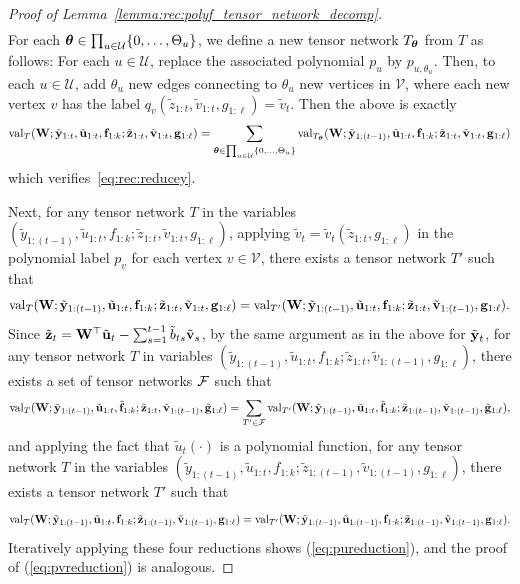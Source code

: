 \documentclass[10pt,reqno]{amsart}
\def\cU{\mathcal{U}}
\def\cV{\mathcal{V}}
\def\val{\operatorname{val}}
\def\bW{{\mathbf{W}}}
\def\bu{{\mathbf{u}}}
\def\bz{{\mathbf{z}}}
\def\bff{{\mathbf{f}}}
\begin{document}
\begin{proof}[Proof of Lemma~\ref{lemma:rec:polyf_tensor_network_decomp}]
\begin{align*}
\end{align*}
For each $\btheta \in \prod_{u\in\cU}\{0,\ldots,\Theta_u\}$,
we define a new tensor network $T_{\bm{\theta}}$ from $T$ as follows: For
each $u\in\cU$, replace the associated polynomial $p_u$ by $p_{u,\theta_u}$. 
Then, to each $u \in \cU$, add $\theta_u$ new edges connecting to $\theta_u$ new 
vertices in $\cV$, where each new vertex $v$ has the label
$q_v(\tilde z_{1:t}, \tilde v_{1:t}, g_{1:\ell}) = \tilde v_t$. 
Then the above is exactly
\begin{align*}
\val_T(\bW;\tilde\by_{1:t},\tilde\bu_{1:{t}},\bff_{1:k};
\tilde\bz_{1:t},\tilde\bv_{1:t},\bg_{1:\ell})
 = \sum_{\btheta\in\prod_{u\in\cU}\{0,\ldots,\Theta_u\}}
\val_{T_{\btheta}}(\bW; \tilde\by_{1:(t-1)}, \tilde\bu_{1:t}, \bff_{1:k};
\tilde\bz_{1:t},\tilde\bv_{1:t},\bg_{1:\ell})
\end{align*}
which verifies~\eqref{eq:rec:reducey}.

Next, for any tensor network $T$ in the variables $(\tilde
y_{1:(t-1)},\tilde u_{1:t},f_{1:k};\tilde z_{1:t},\tilde v_{1:t},g_{1:\ell})$,
applying $\tilde v_t=\tilde v_t(\tilde z_{1:t},g_{1:\ell})$ in the
polynomial label $p_v$ for each vertex $v \in \cV$, there exists a
tensor network $T'$ such that
\[\val_T(\bW;\tilde \by_{1:(t-1)},\tilde
\bu_{1:t},\bff_{1:k};\tilde\bz_{1:t},\tilde\bv_{1:t},\bg_{1:\ell})
=\val_{T'}(\bW;\tilde\by_{1:(t-1)},\tilde\bu_{1:t},\bff_{1:k};
\tilde\bz_{1:t},\tilde\bv_{1:(t-1)},\bg_{1:\ell}).\]
Since $\tilde\zb_t = \bW^\top \tilde\ub_t - \sum_{s=1}^{t-1} \tilde b_{ts}
\tilde \vb_s$, by the same argument as in the above for $\tilde{\mathbf{y}}_t$,
for any tensor network $T$ in variables
$(\tilde y_{1:(t-1)},\tilde u_{1:t},f_{1:k};\tilde z_{1:t},\tilde v_{1:(t-1)},
g_{1:\ell})$, there exists a set of tensor networks $\mathcal{F}$ such that
\[\val_T(\bW;\tilde\by_{1:(t-1)},\tilde\bu_{1:t},\tilde\bff_{1:k};
\tilde\bz_{1:t},\tilde\bv_{1:(t-1)},\tilde\bg_{1:\ell})
= \sum_{T'\in\cF}
\val_{T'}(\bW;\tilde\by_{1:(t-1)},\tilde\bu_{1:t},\tilde\bff_{1:k};
\tilde\bz_{1:(t-1)},\tilde\bv_{1:(t-1)},\tilde\bg_{1:\ell}),\]
and applying the fact that $\tilde u_t(\cdot)$ is a polynomial function, for any 
tensor network $T$ in the variables $(\tilde y_{1:(t-1)},\tilde u_{1:t},f_{1:k}; 
\tilde z_{1:(t-1)},\tilde v_{1:(t-1)},g_{1:\ell})$, there exists a tensor 
network $T'$ such that
\[\val_T(\bW;\tilde\by_{1:(t-1)},\tilde\bu_{1:t},\bff_{1:k};
\tilde\bz_{1:(t-1)},\tilde\bv_{1:(t-1)},\bg_{1:\ell})
=\val_{T'}(\bW;\tilde\by_{1:(t-1)},\tilde\bu_{1:(t-1)},\bff_{1:k};
\tilde\bz_{1:(t-1)},\tilde\bv_{1:(t-1)},\bg_{1:\ell}).\]
Iteratively applying these four reductions shows (\ref{eq:pureduction}), and the
proof of (\ref{eq:pvreduction}) is analogous.
\end{proof}
\end{document}
